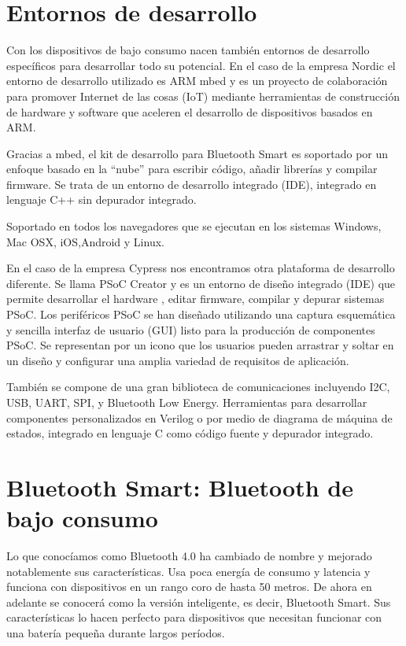 \section{Entornos de desarrollo}
\label{makereference1.1}

Con los dispositivos de bajo consumo nacen también entornos de desarrollo específicos para desarrollar todo su potencial. En el caso de la empresa Nordic el entorno de desarrollo utilizado es ARM mbed y es un proyecto de colaboración para promover Internet de las cosas (IoT) mediante herramientas de construcción de hardware y software que aceleren el desarrollo de dispositivos basados en ARM.

Gracias a mbed, el kit de desarrollo para Bluetooth Smart es soportado por un enfoque basado en la “nube” para escribir código, añadir librerías y compilar firmware. Se trata de un entorno de desarrollo integrado (IDE), integrado en lenguaje C++ sin depurador integrado.

Soportado en todos los navegadores que se ejecutan en los sistemas Windows, Mac OSX, iOS,Android y Linux.

En el caso de la empresa Cypress nos encontramos otra plataforma de desarrollo diferente.
Se llama PSoC Creator y es un entorno de diseño integrado (IDE) que permite desarrollar el hardware , editar firmware, compilar y depurar sistemas PSoC. Los periféricos PSoC se han diseñado utilizando una captura esquemática y sencilla interfaz de usuario (GUI) listo para la producción de componentes PSoC. Se representan por un icono que los usuarios pueden arrastrar y soltar en un diseño y configurar una amplia variedad de requisitos de aplicación.

También  se compone de una gran biblioteca de comunicaciones incluyendo I2C, USB, UART, SPI, y Bluetooth Low Energy. Herramientas para desarrollar componentes personalizados en Verilog o por medio de diagrama de máquina de estados, integrado en lenguaje C como código fuente y depurador integrado.

\section{Bluetooth Smart: Bluetooth de bajo consumo}
\label{makereference1.2}

Lo que conocíamos como Bluetooth 4.0 ha cambiado de nombre y mejorado notablemente sus características. Usa poca energía de consumo y latencia y funciona con dispositivos en un rango coro de hasta 50 metros. De ahora en adelante se conocerá como la versión inteligente, es decir, Bluetooth Smart. 
Sus características lo hacen perfecto para dispositivos que necesitan funcionar con una batería pequeña durante largos períodos.

